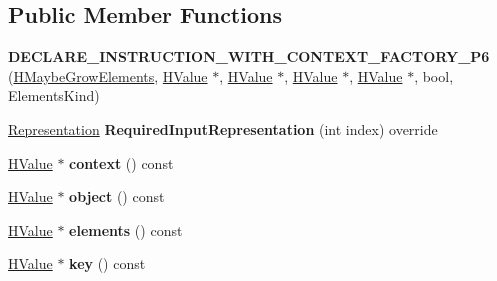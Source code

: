 \subsection*{Public Member Functions}
\begin{DoxyCompactItemize}
\item 
{\bfseries D\+E\+C\+L\+A\+R\+E\+\_\+\+I\+N\+S\+T\+R\+U\+C\+T\+I\+O\+N\+\_\+\+W\+I\+T\+H\+\_\+\+C\+O\+N\+T\+E\+X\+T\+\_\+\+F\+A\+C\+T\+O\+R\+Y\+\_\+\+P6} (\hyperlink{classv8_1_1internal_1_1_h_maybe_grow_elements}{H\+Maybe\+Grow\+Elements}, \hyperlink{classv8_1_1internal_1_1_h_value}{H\+Value} $\ast$, \hyperlink{classv8_1_1internal_1_1_h_value}{H\+Value} $\ast$, \hyperlink{classv8_1_1internal_1_1_h_value}{H\+Value} $\ast$, \hyperlink{classv8_1_1internal_1_1_h_value}{H\+Value} $\ast$, bool, Elements\+Kind)\hypertarget{classv8_1_1internal_1_1_h_maybe_grow_elements_af230fd90affad7260098b6a609712bba}{}\label{classv8_1_1internal_1_1_h_maybe_grow_elements_af230fd90affad7260098b6a609712bba}

\item 
\hyperlink{classv8_1_1internal_1_1_representation}{Representation} {\bfseries Required\+Input\+Representation} (int index) override\hypertarget{classv8_1_1internal_1_1_h_maybe_grow_elements_a69a54fbed95b810633776204626f9121}{}\label{classv8_1_1internal_1_1_h_maybe_grow_elements_a69a54fbed95b810633776204626f9121}

\item 
\hyperlink{classv8_1_1internal_1_1_h_value}{H\+Value} $\ast$ {\bfseries context} () const \hypertarget{classv8_1_1internal_1_1_h_maybe_grow_elements_a866bc060eba2f4293ebb1c007f002b0d}{}\label{classv8_1_1internal_1_1_h_maybe_grow_elements_a866bc060eba2f4293ebb1c007f002b0d}

\item 
\hyperlink{classv8_1_1internal_1_1_h_value}{H\+Value} $\ast$ {\bfseries object} () const \hypertarget{classv8_1_1internal_1_1_h_maybe_grow_elements_a3bf06b25333fb947b6db912e6da57833}{}\label{classv8_1_1internal_1_1_h_maybe_grow_elements_a3bf06b25333fb947b6db912e6da57833}

\item 
\hyperlink{classv8_1_1internal_1_1_h_value}{H\+Value} $\ast$ {\bfseries elements} () const \hypertarget{classv8_1_1internal_1_1_h_maybe_grow_elements_ab257d78318c810e5a2b303ebf5526510}{}\label{classv8_1_1internal_1_1_h_maybe_grow_elements_ab257d78318c810e5a2b303ebf5526510}

\item 
\hyperlink{classv8_1_1internal_1_1_h_value}{H\+Value} $\ast$ {\bfseries key} () const \hypertarget{classv8_1_1internal_1_1_h_maybe_grow_elements_ad097581995ec12c5ca14f0e90c84891c}{}\label{classv8_1_1internal_1_1_h_maybe_grow_elements_ad097581995ec12c5ca14f0e90c84891c}


\end{DoxyCompactItemize}
